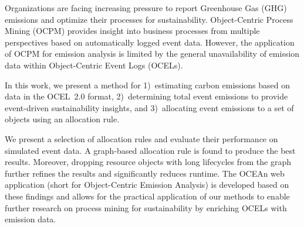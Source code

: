 
Organizations are facing increasing pressure to report Greenhouse Gas (GHG) emissions and optimize their processes for sustainability.
Object-Centric Process Mining (OCPM) provides insight into business processes from multiple perspectives based on automatically logged event data.
However, the application of OCPM for emission analysis is limited by the general unavailability of emission data within Object-Centric Event Logs (OCELs).

In this work, we present a method for
1)\ estimating carbon emissions based on data in the OCEL~2.0 format,
2)\ determining total event emissions to provide event-driven sustainability insights,
and 3)\ allocating event emissions to a set of objects using an allocation rule.

We present a selection of allocation rules
and evaluate their performance on simulated event data.
A graph-based allocation rule is found to produce the best results.
Moreover, dropping resource objects with long lifecycles from the graph further refines the results and significantly reduces runtime.
The OCEAn web application (short for Object-Centric Emission Analysis) is developed based on these findings
and allows for the practical application of our methods to enable further research on process mining for sustainability by enriching OCELs with emission data.
